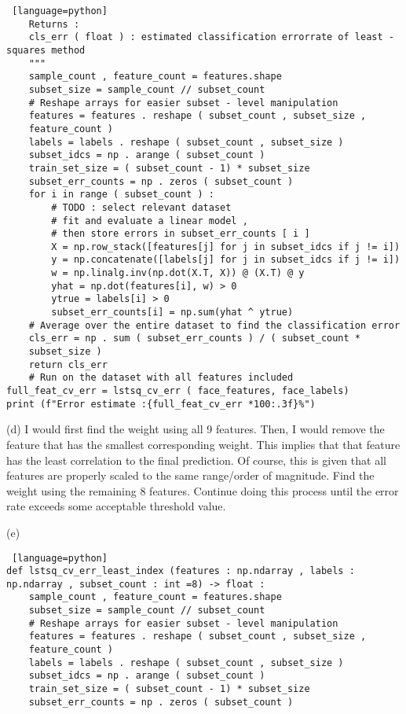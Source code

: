 \documentclass[a4paper, 12pt]{article}
\begin{document}
\begin{solution}
\begin{lstlisting} [language=python]
    Returns :
    cls_err ( float ) : estimated classification errorrate of least - squares method
    """
    sample_count , feature_count = features.shape
    subset_size = sample_count // subset_count
    # Reshape arrays for easier subset - level manipulation
    features = features . reshape ( subset_count , subset_size ,
    feature_count )
    labels = labels . reshape ( subset_count , subset_size )
    subset_idcs = np . arange ( subset_count )
    train_set_size = ( subset_count - 1) * subset_size
    subset_err_counts = np . zeros ( subset_count )
    for i in range ( subset_count ) :
        # TODO : select relevant dataset
        # fit and evaluate a linear model ,
        # then store errors in subset_err_counts [ i ]
        X = np.row_stack([features[j] for j in subset_idcs if j != i])
        y = np.concatenate([labels[j] for j in subset_idcs if j != i])
        w = np.linalg.inv(np.dot(X.T, X)) @ (X.T) @ y
        yhat = np.dot(features[i], w) > 0
        ytrue = labels[i] > 0
        subset_err_counts[i] = np.sum(yhat ^ ytrue)
    # Average over the entire dataset to find the classification error
    cls_err = np . sum ( subset_err_counts ) / ( subset_count *
    subset_size )
    return cls_err
    # Run on the dataset with all features included
full_feat_cv_err = lstsq_cv_err ( face_features, face_labels)
print (f"Error estimate :{full_feat_cv_err *100:.3f}%")
\end{lstlisting}

(d) I would first find the weight using all 9 features. Then, I would remove the feature that has the smallest corresponding weight. This implies that that feature has the least correlation to the final prediction. Of course, this is given that all features are properly scaled to the same range/order of magnitude. Find the weight using the remaining 8 features. Continue doing this process until the error rate exceeds some acceptable threshold value.

(e)
\begin{lstlisting} [language=python]
def lstsq_cv_err_least_index (features : np.ndarray , labels : np.ndarray , subset_count : int =8) -> float :
    sample_count , feature_count = features.shape
    subset_size = sample_count // subset_count
    # Reshape arrays for easier subset - level manipulation
    features = features . reshape ( subset_count , subset_size ,
    feature_count )
    labels = labels . reshape ( subset_count , subset_size )
    subset_idcs = np . arange ( subset_count )
    train_set_size = ( subset_count - 1) * subset_size
    subset_err_counts = np . zeros ( subset_count )


\end{lstlisting}
\end{solution}
\end{document}
